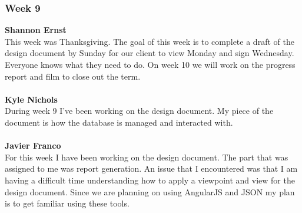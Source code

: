\documentclass[../final.tex]{subfiles}
\begin{document}
\subsubsection{Week 9}
\textbf{Shannon Ernst}\\
This week was Thanksgiving. The goal of this week is to complete a draft of the design document by Sunday for our client to view Monday and sign Wednesday. Everyone knows what they need to do. On week 10 we will work on the progress report and film to close out the term. \\ \\
\textbf{Kyle Nichols}\\
During week 9 I've been working on the design document. My piece of the document is how the database is managed and interacted with. \\ \\
\textbf{Javier Franco}\\
For this week I have been working on the design document. The part that was assigned to me was report generation. An issue that I encountered was that I am having a difficult time understanding how to apply a viewpoint and view for the design document. Since we are planning on using AngularJS and JSON my plan is to get familiar using these tools. \\
\end{document}
